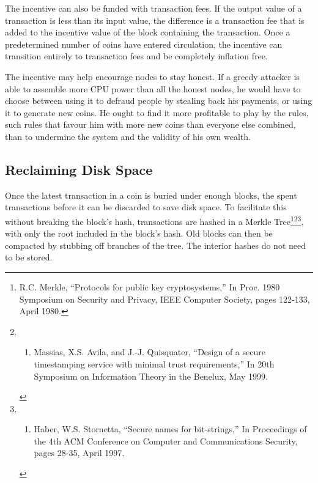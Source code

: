 The incentive can also be funded with transaction fees. If the output
value of a transaction is less than its input value, the difference is a
transaction fee that is added to the incentive value of the block
containing the transaction. Once a predetermined number of coins have
entered circulation, the incentive can transition entirely to
transaction fees and be completely inflation free.

The incentive may help encourage nodes to stay honest. If a greedy
attacker is able to assemble more CPU power than all the honest nodes,
he would have to choose between using it to defraud people by stealing
back his payments, or using it to generate new coins. He ought to find
it more profitable to play by the rules, such rules that favour him with
more new coins than everyone else combined, than to undermine the system
and the validity of his own wealth.

\subsection{Reclaiming Disk Space}\label{reclaiming-disk-space}

Once the latest transaction in a coin is buried under enough blocks, the
spent transactions before it can be discarded to save disk space. To
facilitate this without breaking the block's hash, transactions are
hashed in a Merkle Tree\footnote{R.C. Merkle, ``Protocols for public key
  cryptosystems,'' In Proc. 1980 Symposium on Security and Privacy, IEEE
  Computer Society, pages 122-133, April 1980.}\footnote{\begin{enumerate}
  \def\labelenumi{\Alph{enumi}.}
  \setcounter{enumi}{7}
  \tightlist
  \item
    Massias, X.S. Avila, and J.-J. Quisquater, ``Design of a secure
    timestamping service with minimal trust requirements,'' In 20th
    Symposium on Information Theory in the Benelux, May 1999.
  \end{enumerate}}\footnote{\begin{enumerate}
  \def\labelenumi{\Alph{enumi}.}
  \setcounter{enumi}{18}
  \tightlist
  \item
    Haber, W.S. Stornetta, ``Secure names for bit-strings,'' In
    Proceedings of the 4th ACM Conference on Computer and Communications
    Security, pages 28-35, April 1997.
  \end{enumerate}}, with only the root included in the block's hash. Old
blocks can then be compacted by stubbing off branches of the tree. The
interior hashes do not need to be stored.

